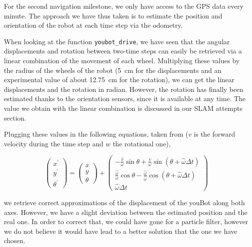 \documentclass[a4paper, 10pt, conference]{ieeeconf}
\begin{document}
    For the second navigation milestone, we only have access to the GPS data every minute. The approach we have thus taken is to estimate the position and orientation of the robot at each time step via the odometry.
    
    When looking at the function \texttt{youbot\_drive}, we have seen that the angular displacements and rotation between two-time steps can easily be retrieved via a linear combination of the movement of each wheel. Multiplying these values by the radius of the wheels of the robot (\SI{5}{\centi\meter} for the displacements and an experimental value of about \SI{12.75}{\centi\meter} for the rotation), we can get the linear displacements and the rotation in radian. However, the rotation has finally been estimated thanks to the orientation sensors, since it is available at any time. The value we obtain with the linear combination is discussed in our SLAM attempts section. 
    
    Plugging these values in the following equations, taken from \cite{probaRobotics} ($v$ is the forward velocity during the time step and $w$ the rotational one),

    \begin{equation*}
        \left(\begin{array}{l}
            x^{\prime} \\ y^{\prime} \\ \theta^{\prime}
        \end{array}\right)
        =
        \left(\begin{array}{l}
            x \\ y \\ \theta
        \end{array}\right)
        +
        \left(\begin{array}{c}
            -\frac{\hat{v}}{\omega} \sin \theta+\frac{\hat{v}}{\omega} \sin (\theta+\hat{\omega} \Delta t) \\ \frac{\hat{\omega}}{\omega} \cos \theta-\frac{\hat{\omega}}{\hat{\omega}} \cos (\theta+\hat{\omega} \Delta t) \\ \hat{\omega} \Delta t
        \end{array}\right)
    \end{equation*}

    we retrieve correct approximations of the displacement of the youBot along both axes. However, we have a slight deviation between the estimated position and the real one. In order to correct that, we could have gone for a particle filter, however we do not believe it would have lead to a better solution that the one we have chosen.
    
\end{document}
